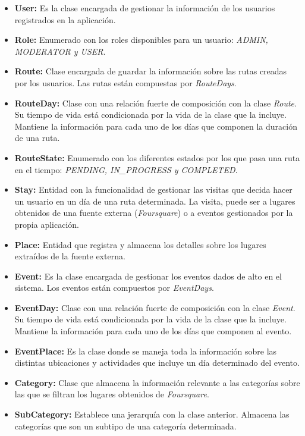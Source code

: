 \begin{itemize}
	\item \textbf{User: } Es la clase encargada de gestionar la información de los usuarios registrados en la aplicación.
	\item \textbf{Role: } Enumerado con los roles disponibles para un usuario: \textit{ADMIN, MODERATOR y USER}.
	\item \textbf{Route: } Clase encargada de guardar la información sobre las rutas creadas por los usuarios. Las rutas están compuestas por \textit{RouteDays}.
	\item \textbf{RouteDay: } Clase con una relación fuerte de composición con la clase \textit{Route}. Su tiempo de vida está condicionada por la vida de la clase que la incluye. Mantiene la información para cada uno de los días que componen la duración de una ruta.
	\item \textbf{RouteState: } Enumerado con los diferentes estados por los que pasa una ruta en el tiempo: \textit{PENDING, IN\_PROGRESS y COMPLETED}.
	\item \textbf{Stay: } Entidad con la funcionalidad de gestionar las visitas que decida hacer un usuario en un día de una ruta determinada. La visita, puede ser a lugares obtenidos de una fuente externa (\textit{Foursquare}) o a eventos gestionados por la propia aplicación.
	\item \textbf{Place: } Entidad que registra y almacena los detalles sobre los lugares extraídos de la fuente externa.
	\item \textbf{Event: } Es la clase encargada de gestionar los eventos dados de alto en el sistema. Los eventos están compuestos por \textit{EventDays}.
	\item \textbf{EventDay: } Clase con una relación fuerte de composición con la clase \textit{Event}. Su tiempo de vida está condicionada por la vida de la clase que la incluye. Mantiene la información para cada uno de los días que componen al evento.
	\item \textbf{EventPlace: } Es la clase donde se maneja toda la información sobre las distintas ubicaciones y actividades que incluye un día determinado del evento.
	\item \textbf{Category: } Clase que almacena la información relevante a las categorías sobre las que se filtran los lugares obtenidos de \textit{Foursquare}.
	\item \textbf{SubCategory: } Establece una jerarquía con la clase anterior. Almacena las categorías que son un subtipo de una categoría determinada.
\end{itemize}

